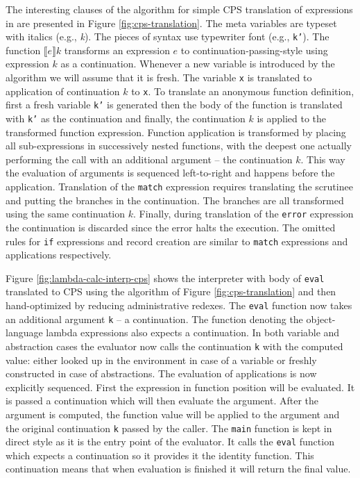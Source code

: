 The interesting clauses of the algorithm for simple CPS translation of expressions in \IDL{} are presented in Figure \ref{fig:cps-translation}.
The meta variables are typeset with italics (e.g., \textit{k}).
The pieces of syntax use typewriter font (e.g., \texttt{k'}).
The function $ \llbracket e \rrbracket k $ transforms an expression $e$ to continuation-passing-style using expression $k$ as a continuation.
Whenever a new variable is introduced by the algorithm we will assume that it is fresh.
The variable \texttt{x} is translated to application of continuation $k$ to \texttt{x}.
To translate an anonymous function definition, first a fresh variable \texttt{k'} is generated then the body of the function is translated with \texttt{k'} as the continuation and finally, the continuation $k$ is applied to the transformed function expression.
Function application is transformed by placing all sub-expressions in successively nested functions, with the deepest one actually performing the call with an additional argument -- the continuation $k$.
This way the evaluation of arguments is sequenced left-to-right and happens before the application.
Translation of the \texttt{match} expression requires translating the scrutinee and putting the branches in the continuation. The branches are all transformed using the same continuation $k$.
Finally, during translation of the \texttt{error} expression the continuation is discarded since the error halts the execution.
The omitted rules for \texttt{if} expressions and record creation are similar to \texttt{match} expressions and applications respectively.

Figure \ref{fig:lambda-calc-interp-cps} shows the interpreter with body of \lstinline!eval! translated to CPS using the algorithm of Figure \ref{fig:cps-translation} and then hand-optimized by reducing administrative redexes.
The \lstinline!eval! function now takes an additional argument \lstinline!k! -- a continuation.
The function denoting the object-language lambda expressions also expects a continuation.
In both variable and abstraction cases the evaluator now calls the continuation \lstinline!k! with the computed value: either looked up in the environment in case of a variable or freshly constructed in case of abstractions.
The evaluation of applications is now explicitly sequenced.
First the expression in function position will be evaluated.
It is passed a continuation which will then evaluate the argument.
After the argument is computed, the function value will be applied to the argument and the original continuation \lstinline!k! passed by the caller.
The \lstinline!main! function is kept in direct style as it is the entry point of the evaluator.
It calls the \lstinline!eval! function which expects a continuation so it provides it the identity function.
This continuation means that when evaluation is finished it will return the final value.

